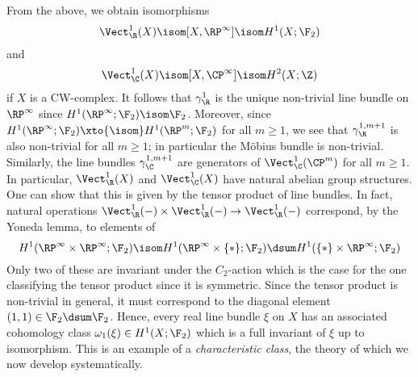 \begin{example}
	From the above, we obtain isomorphisms
	\begin{equation*}
		\Vect_{\R}^1(X) \isom [X, \RP^\infty] \isom H^1(X; \F_2)
	\end{equation*}
	and
	\begin{equation*}
		\Vect_{\C}^1(X) \isom [X, \CP^\infty] \isom H^2(X; \Z)
	\end{equation*}
	if $X$ is a CW-complex.
	It follows that $\gamma_{\R}^1$ is the unique non-trivial line bundle on $\RP^\infty$ since $H^1(\RP^\infty; \F_2) \isom \F_2$.
	Moreover, since $H^1(\RP^\infty; \F_2) \xto{\isom} H^1(\RP^m; \F_2)$ for all $m \geq 1$, we see that $\gamma_{\R}^{1, m + 1}$ is also non-trivial for all $m \geq 1$; in particular the Möbius bundle is non-trivial.
	Similarly, the line bundles $\gamma_{\C}^{1, m + 1}$ are generators of $\Vect_{\C}^1(\CP^m)$ for all $m \geq 1$.
	In particular, $\Vect_{\R}^1(X)$ and $\Vect_{\C}^1(X)$ have natural abelian group structures.
	One can show that this is given by the tensor product of line bundles.
	In fact, natural operations $\Vect_{\R}^1({{-}}) \times \Vect_{\R}^1({{-}}) \to \Vect_{\R}^1({{-}})$ correspond, by the Yoneda lemma, to elements of
	\begin{equation*}
		H^1(\RP^\infty \times \RP^\infty; \F_2) \isom H^1(\RP^\infty \times \{*\}; \F_2) \dsum H^1(\{*\} \times \RP^\infty; \F_2)
	\end{equation*}
	Only two of these are invariant under the $C_2$-action which is the case for the one classifying the tensor product since it is symmetric.
	Since the tensor product is non-trivial in general, it must correspond to the diagonal element $(1, 1) \in \F_2 \dsum \F_2$.
	Hence, every real line bundle $\xi$ on $X$ has an associated cohomology class $\omega_1(\xi) \in H^1(X; \F_2)$ which is a full invariant of $\xi$ up to isomorphism.
	This is an example of a \emph{characteristic class}, the theory of which we now develop systematically.
\end{example}

